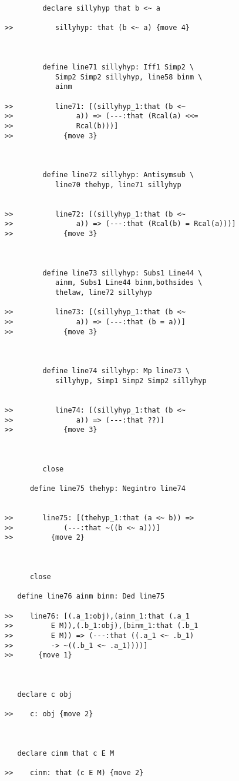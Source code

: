 \documentclass[12pt]{article}
\begin{document}
\begin{verbatim}
         declare sillyhyp that b <~ a

>>          sillyhyp: that (b <~ a) {move 4}



         define line71 sillyhyp: Iff1 Simp2 \
            Simp2 Simp2 sillyhyp, line58 binm \
            ainm

>>          line71: [(sillyhyp_1:that (b <~
>>               a)) => (---:that (Rcal(a) <<=
>>               Rcal(b)))]
>>            {move 3}



         define line72 sillyhyp: Antisymsub \
            line70 thehyp, line71 sillyhyp


>>          line72: [(sillyhyp_1:that (b <~
>>               a)) => (---:that (Rcal(b) = Rcal(a)))]
>>            {move 3}



         define line73 sillyhyp: Subs1 Line44 \
            ainm, Subs1 Line44 binm,bothsides \
            thelaw, line72 sillyhyp

>>          line73: [(sillyhyp_1:that (b <~
>>               a)) => (---:that (b = a))]
>>            {move 3}



         define line74 sillyhyp: Mp line73 \
            sillyhyp, Simp1 Simp2 Simp2 sillyhyp


>>          line74: [(sillyhyp_1:that (b <~
>>               a)) => (---:that ??)]
>>            {move 3}



         close

      define line75 thehyp: Negintro line74


>>       line75: [(thehyp_1:that (a <~ b)) =>
>>            (---:that ~((b <~ a)))]
>>         {move 2}



      close

   define line76 ainm binm: Ded line75

>>    line76: [(.a_1:obj),(ainm_1:that (.a_1
>>         E M)),(.b_1:obj),(binm_1:that (.b_1
>>         E M)) => (---:that ((.a_1 <~ .b_1)
>>         -> ~((.b_1 <~ .a_1))))]
>>      {move 1}



   declare c obj

>>    c: obj {move 2}



   declare cinm that c E M

>>    cinm: that (c E M) {move 2}




\end{verbatim}
\end{document}
